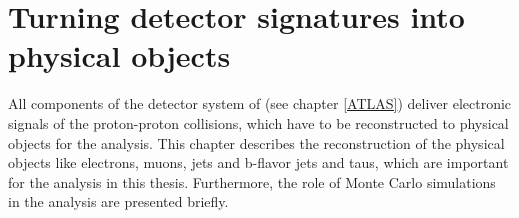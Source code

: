 \chapter{Turning detector signatures into physical objects}
All components of the detector system of {\ATLAS} (see chapter \ref{ATLAS}) deliver electronic signals of the proton-proton collisions, which have to be reconstructed to physical objects for the analysis. This chapter describes the reconstruction of the physical objects like electrons, muons, jets and b-flavor jets and taus, which are important for the analysis in this thesis. Furthermore, the role of Monte Carlo simulations in the analysis are presented briefly.

